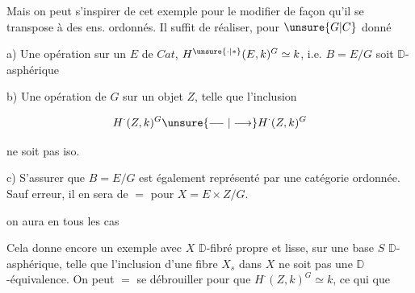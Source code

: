 
Mais on peut s'inspirer de cet exemple pour le modifier de façon qu'il se transpose à des ens. ordonnés. Il suffit de réaliser, pour $\unsure{G|C}$ donné

a) Une opération  sur un  $E$ de $\mathit{Cat}$,    $H^{\unsure{\cdot|*}}(E,k)^G\simeq k$, i.e. $B=E/G$ soit $\mathbb D$-asphérique

b) Une opération de $G$ sur un objet $Z$, telle que l'inclusion

\[
H^{\cdot}(Z,k)^G\unsure{\relbar\joinrel\relbar|\longrightarrow}H^{\cdot}(Z,k)^G
\]

ne soit pas iso.

c)  S'assurer que $B=E/G$ est également représenté par une catégorie ordonnée. Sauf erreur, il en sera de $=$ pour $X=E\times Z/G$.

 on aura en tous les cas


Cela donne encore un exemple avec $X$ $\mathbb D$-fibré propre et lisse, sur une base $S$ $\mathbb D$-asphérique, telle que l'inclusion d'une fibre $X_s$ dans $X$ ne soit pas une $\mathbb D$-équivalence. On peut $=$ se débrouiller pour que $H^{\cdot}(Z,k)^G\simeq k$, ce qui  que

